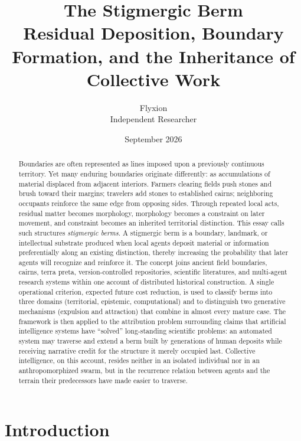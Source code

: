 \documentclass[11pt]{article}
\title{The Stigmergic Berm\\
\large Residual Deposition, Boundary Formation, and the Inheritance of Collective Work}
\author{Flyxion\\ \small Independent Researcher}
\date{September 2026}
\begin{document}
\maketitle

\begin{abstract}
Boundaries are often represented as lines imposed upon a previously continuous territory. Yet many enduring boundaries originate differently: as accumulations of material displaced from adjacent interiors. Farmers clearing fields push stones and brush toward their margins; travelers add stones to established cairns; neighboring occupants reinforce the same edge from opposing sides. Through repeated local acts, residual matter becomes morphology, morphology becomes a constraint on later movement, and constraint becomes an inherited territorial distinction. This essay calls such structures \emph{stigmergic berms}. A stigmergic berm is a boundary, landmark, or intellectual substrate produced when local agents deposit material or information preferentially along an existing distinction, thereby increasing the probability that later agents will recognize and reinforce it. The concept joins ancient field boundaries, cairns, terra preta, version-controlled repositories, scientific literatures, and multi-agent research systems within one account of distributed historical construction. A single operational criterion, expected future cost reduction, is used to classify berms into three domains (territorial, epistemic, computational) and to distinguish two generative mechanisms (expulsion and attraction) that combine in almost every mature case. The framework is then applied to the attribution problem surrounding claims that artificial intelligence systems have ``solved'' long-standing scientific problems: an automated system may traverse and extend a berm built by generations of human deposits while receiving narrative credit for the structure it merely occupied last. Collective intelligence, on this account, resides neither in an isolated individual nor in an anthropomorphized swarm, but in the recurrence relation between agents and the terrain their predecessors have made easier to traverse.
\end{abstract}

\tableofcontents

\section{Introduction}
\end{document}
